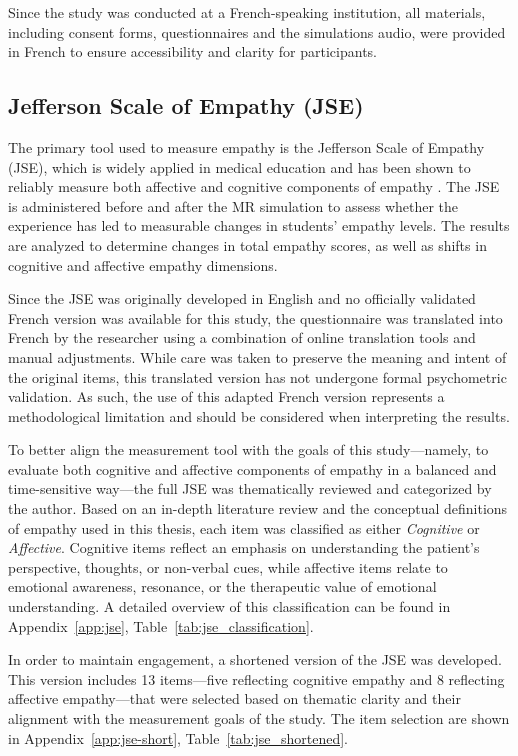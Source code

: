 Since the study was conducted at a French-speaking institution, all materials, including consent forms, questionnaires and the simulations audio, were provided in French to ensure accessibility and clarity for participants.

\subsection{Jefferson Scale of Empathy (JSE)}
\label{sec:jse}

The primary tool used to measure empathy is the Jefferson Scale of Empathy (JSE), which is widely applied in medical education and has been shown to reliably measure both affective and cognitive components of empathy \cite{Hojat2002}. The JSE is administered before and after the MR simulation to assess whether the experience has led to measurable changes in students’ empathy levels. The results are analyzed to determine changes in total empathy scores, as well as shifts in cognitive and affective empathy dimensions.

Since the JSE was originally developed in English and no officially validated French version was available for this study, the questionnaire was translated into French by the researcher using a combination of online translation tools and manual adjustments. While care was taken to preserve the meaning and intent of the original items, this translated version has not undergone formal psychometric validation. As such, the use of this adapted French version represents a methodological limitation and should be considered when interpreting the results.

To better align the measurement tool with the goals of this study—namely, to evaluate both cognitive and affective components of empathy in a balanced and time-sensitive way—the full JSE was thematically reviewed and categorized by the author. Based on an in-depth literature review and the conceptual definitions of empathy used in this thesis, each item was classified as either \textit{Cognitive} or \textit{Affective}. Cognitive items reflect an emphasis on understanding the patient’s perspective, thoughts, or non-verbal cues, while affective items relate to emotional awareness, resonance, or the therapeutic value of emotional understanding. A detailed overview of this classification can be found in Appendix~\ref{app:jse}, Table~\ref{tab:jse_classification}.

In order to maintain engagement, a shortened version of the JSE was developed. This version includes 13 items—five reflecting cognitive empathy and 8 reflecting affective empathy—that were selected based on thematic clarity and their alignment with the measurement goals of the study. The item selection are shown in Appendix~\ref{app:jse-short}, Table~\ref{tab:jse_shortened}. %


